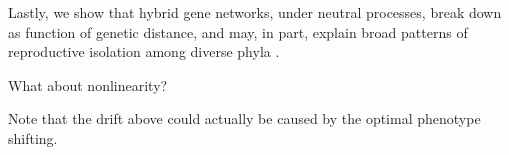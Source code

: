 \documentclass{article}
\newcommand{\plr}[1]{\todo[color=blue!25]{#1}}
\newcommand{\js}[1]{\todo[color=green!25]{#1}}
\newcommand{\plr}[1]{{\color{blue}\it #1}}
\newcommand{\js}[1]{{\color{green}\it #1}}
\newcommand{\1}{\mathbbm{1}}
\begin{document}
Lastly, we show that hybrid gene networks, under neutral processes, break down as function of genetic distance, and may, in part, explain broad patterns of reproductive isolation among diverse phyla \citep{roux2016shedding}.

What about nonlinearity?

Note that the drift above could actually be caused by the optimal phenotype shifting.


\end{document}
